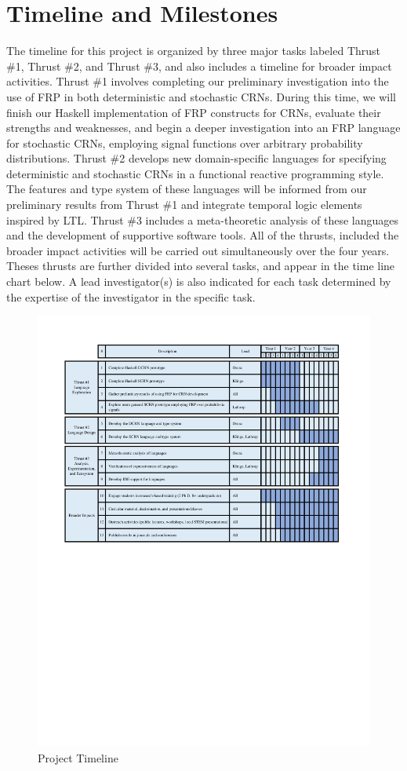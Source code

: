 
\section{Timeline and Milestones}
\label{sec:timeline}

The timeline for this project is organized by three major tasks labeled Thrust \#1, Thrust \#2, and Thrust \#3, and also includes a timeline for broader impact activities.
Thrust \#1 involves completing our preliminary investigation into the use of FRP in both deterministic and stochastic CRNs.
During this time, we will finish our Haskell implementation of FRP constructs for CRNs, evaluate their strengths and weaknesses, and begin a deeper investigation into an FRP language for stochastic CRNs, employing signal functions over arbitrary probability distributions.
Thrust \#2 develops new domain-specific languages for specifying deterministic and stochastic CRNs in a functional reactive programming style.
The features and type system of these languages will be informed from our preliminary results from Thrust \#1 and integrate temporal logic elements inspired by LTL.
Thrust \#3 includes a meta-theoretic analysis of these languages and the development of supportive software tools.
All of the thrusts, included the broader impact activities will be carried out simultaneously over the four years.
Theses thrusts are further divided into several tasks, and appear in the time line chart below.
A lead investigator(s) is also indicated for each task determined by the expertise of the investigator in the specific task.

\begin{figure}[h!]
     \centering
     \includegraphics[width=6.4in]{TimeLine.pdf}
     \caption{Project Timeline}
 \end{figure}



